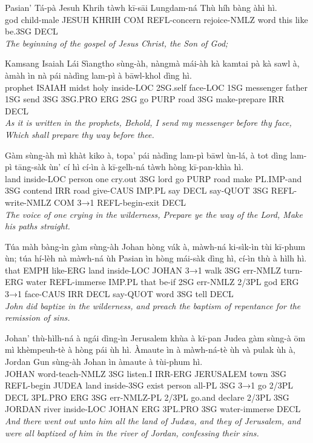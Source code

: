 \documentclass[11pt,a4paper]{article}
\begin{document}
\begin{exe}
\gll Pasian' Tá-pà Jesuh Khrih tàwh kī-sāi Lungdam-ná Thù híh bàng àhì hì. \\
     god child-male JESUH KHRIH COM REFL-concern rejoice-NMLZ word this like be.3SG DECL \\
\glt \textcolor{kjvcolor}{\textit{The beginning of the gospel of Jesus Christ, the Son of God;}}

\gll Kamsang Isaiah Lái Sìangtho sùng-àh, nàngmà mái-àh kà kamtai pà kà sawl à, àmàh ìn nà pái nàdìng lam-pì à bāwl-khol dìng hì. \\
     prophet ISAIAH midst holy inside-LOC 2SG.self face-LOC 1SG messenger father 1SG send 3SG 3SG.PRO ERG 2SG go PURP road 3SG make-prepare IRR DECL \\
\glt \textcolor{kjvcolor}{\textit{As it is written in the prophets, Behold, I send my messenger before thy face, Which shall prepare thy way before thee.}}

\gll Gàm sùng-àh mì khàt kiko à, topa' pái nàdìng lam-pì bāwl ùn-lá, à tot dìng lam-pì tāng-sàk ùn' cí hì cí-ìn à kī-gelh-ná tàwh hòng kī-pan-khìa hì. \\
     land inside-LOC person one cry.out 3SG lord go PURP road make PL.IMP-and 3SG contend IRR road give-CAUS IMP.PL say DECL say-QUOT 3SG REFL-write-NMLZ COM 3→1 REFL-begin-exit DECL \\
\glt \textcolor{kjvcolor}{\textit{The voice of one crying in the wilderness, Prepare ye the way of the Lord, Make his paths straight.}}

\gll Túa màh bàng-ìn gàm sùng-àh Johan hòng vák à, màwh-ná ki-sìk-ìn tùi kī-phum ùn; túa hí-lèh nà màwh-ná ùh Pasian ìn hòng mái-sàk dìng hì, cí-ìn thù à hìlh hì. \\
     that EMPH like-ERG land inside-LOC JOHAN 3→1 walk 3SG err-NMLZ turn-ERG water REFL-immerse IMP.PL that be-if 2SG err-NMLZ 2/3PL god ERG 3→1 face-CAUS IRR DECL say-QUOT word 3SG tell DECL \\
\glt \textcolor{kjvcolor}{\textit{John did baptize in the wilderness, and preach the baptism of repentance for the remission of sins.}}

\gll Johan' thù-hìlh-ná à ngái dìng-ìn Jerusalem khùa à kī-pan Judea gàm sùng-à ōm mì khèmpeuh-tè à hòng pái ùh hì. Àmaute ìn à màwh-ná-tè ùh và pulak ùh à, Jordan Gun sùng-àh Johan ìn àmaute à tùi-phum hì. \\
     JOHAN word-teach-NMLZ 3SG listen.I IRR-ERG JERUSALEM town 3SG REFL-begin JUDEA land inside-3SG exist person all-PL 3SG 3→1 go 2/3PL DECL 3PL.PRO ERG 3SG err-NMLZ-PL 2/3PL go.and declare 2/3PL 3SG JORDAN river inside-LOC JOHAN ERG 3PL.PRO 3SG water-immerse DECL \\
\glt \textcolor{kjvcolor}{\textit{And there went out unto him all the land of Judæa, and they of Jerusalem, and were all baptized of him in the river of Jordan, confessing their sins.}}


\end{exe}
\end{document}

